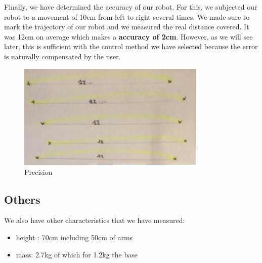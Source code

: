 Finally, we have determined the accuracy of our robot. For this, we subjected our robot to a movement of 10cm from left to right several times. We made sure to mark the trajectory of our robot and we measured the real distance covered. It was 12cm on average which makes a \textbf{accuracy of 2cm}. However, as we will see later, this is sufficient with the control method we have selected because the error is naturally compensated by the user.
\begin{figure}[ht]
    \centering
    \includegraphics[width=0.8\textwidth]{images/Section04/precision.png}
    \caption{Precision}
    \label{fig:mesh26}
\end{figure}
\FloatBarrier

\subsection{Others}

We also have other characteristics that we have measured:
\begin{itemize}[noitemsep]
    \item height : 70cm including 50cm of arms
    \item mass: 2.7kg of which for 1.2kg the base
\end{itemize}
